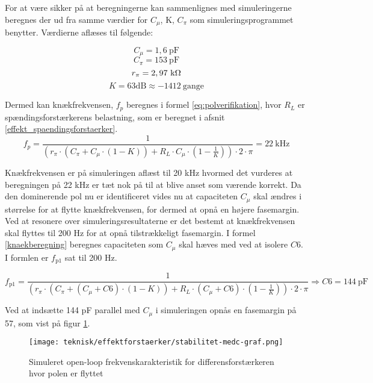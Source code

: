For at være sikker på at beregningerne kan sammenlignes med simuleringerne beregnes der ud fra samme værdier for $C_\mu$, K, $C_\pi$ som simuleringsprogrammet benytter. Værdierne aflæses til følgende: 

\[ C_\mu=1,6~\mathrm{pF} \]
\[ C_\pi=153~\mathrm{pF} \]
\[ r_\pi=2,97~\mathrm{k}\ohm \]
\[ K=63 \mathrm{dB} \approx -1412~\mathrm{gange}\]

Dermed kan knækfrekvensen, $f_p$ beregnes i formel \ref{eq:polverifikation}, hvor $R_L$ er spændingsforstærkerens belastning, som er beregnet i afsnit \ref{effekt_spaendingsforstaerker}.
\begin{equation}
f_p=\frac{1}{(r_\pi \cdot (C_\pi + C_\mu \cdot \left( 1-K \right)) + R_L \cdot C_\mu \cdot \left( 1-\frac{1}{K} \right)) \cdot 2 \cdot \pi}=22~\mathrm{kHz}
\label{eq:polverifikation}
\end{equation}

Knækfrekvensen er på simuleringen aflæst til 20 kHz hvormed det vurderes at beregningen på 22 kHz er tæt nok på til at blive anset som værende korrekt. 
Da den dominerende pol nu er identificeret vides nu at capaciteten $C_\mu$ skal ændres i størrelse for at flytte knækfrekvensen, for dermed at opnå en højere fasemargin. Ved at resonere over simuleringsresultaterne er det bestemt at knækfrekvensen skal flyttes til 200 Hz for at opnå tilstrækkeligt fasemargin. I formel \ref{knaekberegning} beregnes capaciteten som $C_\mu$ skal hæves med ved at isolere $C6$. I formlen er $f_\mathrm{p1}$ sat til 200 Hz. 

\begin{equation}
f_\mathrm{p1}=\frac{1}{(r_\pi \cdot (C_\pi + (C_\mu + C6) \cdot \left( 1-K \right)) + R_L \cdot (C_\mu + C6) \cdot \left( 1-\frac{1}{K} \right)) \cdot 2 \cdot \pi} \Rightarrow C6=144~\mathrm{pF}
\label{knaekberegning}
\end{equation}

Ved at indsætte 144 pF parallel med $C_\mu$ i simuleringen opnås en fasemargin på 57\degree, som vist på figur \ref{openloop_efter_korrektion}.

\begin{figure}[h]
\centering
\texttt{[image: teknisk/effektforstaerker/stabilitet-medc-graf.png]}
\caption{Simuleret open-loop frekvenskarakteristik for differensforstærkeren hvor polen er flyttet}
\label{openloop_efter_korrektion}
\end{figure}